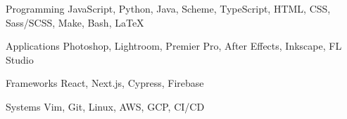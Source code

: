 

\begin{cvskills}

  \cvskill
    {Programming} %
    {JavaScript, Python, Java, Scheme, TypeScript, HTML, CSS, Sass/SCSS, Make, Bash, \LaTeX} %

  \cvskill
    {Applications} %
    {Photoshop, Lightroom, Premier Pro, After Effects, Inkscape, FL Studio} %

  \cvskill
    {Frameworks} %
    {React, Next.js, Cypress, Firebase} %

  \cvskill
    {Systems} %
    {Vim, Git, Linux, AWS, GCP, CI/CD} %

\end{cvskills}
